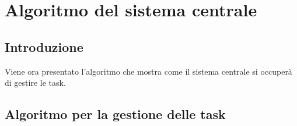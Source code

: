 \section{Algoritmo del sistema centrale}
\subsection{Introduzione}
Viene ora presentato l'algoritmo che mostra come il sistema centrale si occuperà di gestire le task.
\subsection{Algoritmo per la gestione delle task}


